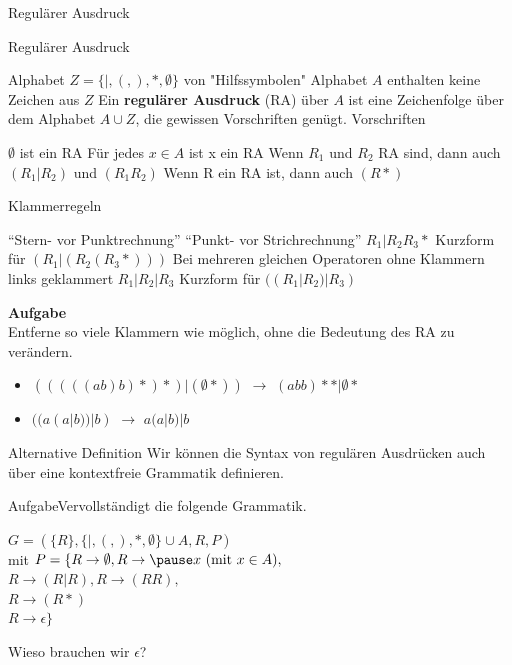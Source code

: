 \begin{frame}{Regulärer Ausdruck}
	\begin{block}{Regulärer Ausdruck}
		\begin{itemize}
			\pitem Alphabet $Z = \{ |, (,), *, \emptyset\}$ von "Hilfssymbolen"
			\pitem Alphabet $A$ enthalten keine Zeichen aus $Z$
			\pitem Ein \textbf{regulärer Ausdruck} (RA) über $A$ ist eine Zeichenfolge über dem Alphabet $A \cup Z$, die gewissen Vorschriften genügt.
			\pitem Vorschriften
			\begin{itemize}
				\pitem $\emptyset$ ist ein RA
				\pitem Für jedes $x \in A$ ist x ein RA
				\pitem Wenn $R_1$ und $R_2$ RA sind, dann auch $(R_1|R_2)$ und $(R_1R_2)$
				\pitem Wenn R ein RA ist, dann auch $(R*)$
			\end{itemize}
		\end{itemize}
	\end{block}
\end{frame}

\begin{frame}{Klammerregeln}
	\begin{itemize}
		\pitem ``Stern- vor Punktrechnung''
		\pitem ``Punkt- vor Strichrechnung''
		\pitem[$\rightarrow$]$R_1|R_2R_3*$ Kurzform für $(R_1|(R_2(R_3*)))$
		\pitem Bei mehreren gleichen Operatoren ohne Klammern links geklammert
		\pitem[$\rightarrow$] $R_1|R_2|R_3$ Kurzform für $((R_1|R_2)|R_3)$
	\end{itemize}
	\pause
	\textbf{Aufgabe}\\
	Entferne so viele Klammern wie möglich, ohne die Bedeutung des RA zu verändern.\\
	\begin{itemize}
		\item $(((((ab)b)*)*)|(\emptyset*))$ \pause $\rightarrow$ $(abb)**|\emptyset*$ \pause
		\item $((a(a|b))|b)$ \pause  $\rightarrow$ $a(a|b)|b$
	\end{itemize}
\end{frame}

\begin{frame}{Alternative Definition}
	Wir können die Syntax von regulären Ausdrücken auch über eine kontextfreie Grammatik definieren. \\ \vspace{0.2cm}
	\begin{taskblock}{Aufgabe}Vervollständigt die folgende Grammatik.\end{taskblock}
	$G = (\{R\}, \{|,(,),*,\emptyset\} \cup A, R, P)$\\
	mit $P =\{R\rightarrow \emptyset, R \rightarrow \pause x \text{ }(\text{mit } x \in A),$\\$
	R \rightarrow (R|R), R \rightarrow (RR),$\\$
	R \rightarrow(R*)$\\$
	R \rightarrow \epsilon\}$
	
	\pause
	
	\vspace{.4cm} 
	Wieso brauchen wir $\epsilon$?
\end{frame}

